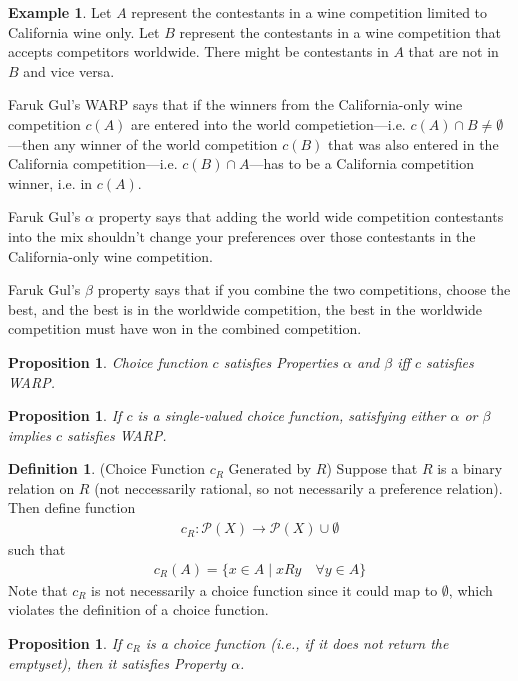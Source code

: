 \documentclass[12pt]{article}
\theoremstyle{plain}
\newtheorem{prop}[thm]{Proposition}
\theoremstyle{definition}
\newtheorem{defn}[thm]{Definition}
\newtheorem{ex}[thm]{Example}
\theoremstyle{remark}
\newcommand{\ra}{\rightarrow}
\newcommand{\calP}{\mathcal{P}}
\begin{document}
\begin{ex}
Let $A$ represent the contestants in a wine competition limited to
California wine only. Let $B$ represent the contestants in a wine
competition that accepts competitors worldwide. There might be
contestants in $A$ that are not in $B$ and vice versa.

Faruk Gul's WARP says that if the winners from the California-only wine
competition $c(A)$ are entered into the world competietion---i.e.
$c(A)\cap B\neq \emptyset$---then any winner of the world competition
$c(B)$ that was also entered in the California competition---i.e.  $c(B)
\cap A$---has to be a California competition winner, i.e. in $c(A)$.

Faruk Gul's $\alpha$ property says that adding the world wide
competition contestants into the mix shouldn't change your preferences
over those contestants in the California-only wine competition.

Faruk Gul's $\beta$ property says that if you combine the two
competitions, choose the best, and the best is in the worldwide
competition, the best in the worldwide competition must have won
in the combined competition.
\end{ex}

\begin{prop}
Choice function $c$ satisfies Properties $\alpha$ and $\beta$ iff $c$
satisfies WARP.
\end{prop}

\begin{prop}
If $c$ is a single-valued choice function, satisfying either $\alpha$ or
$\beta$ implies $c$ satisfies WARP.
\end{prop}


\begin{defn}(Choice Function $c_R$ Generated by $R$)
Suppose that $R$ is a binary relation on $R$ (not neccessarily rational,
so not necessarily a preference relation). Then define function
\begin{align*}
  c_R: \calP(X) \ra \calP(X)\cup\emptyset
\end{align*}
such that
\begin{align*}
  c_R(A) = \{x\in A\;|\; xRy \quad\forall y\in A\}
\end{align*}
Note that $c_R$ is not necessarily a choice function since it could map
to $\emptyset$, which violates the definition of a choice function.
\end{defn}

\begin{prop}
If $c_R$ is a choice function (i.e., if it does not return the
emptyset), then it satisfies Property $\alpha$.
\end{prop}
\end{document}

